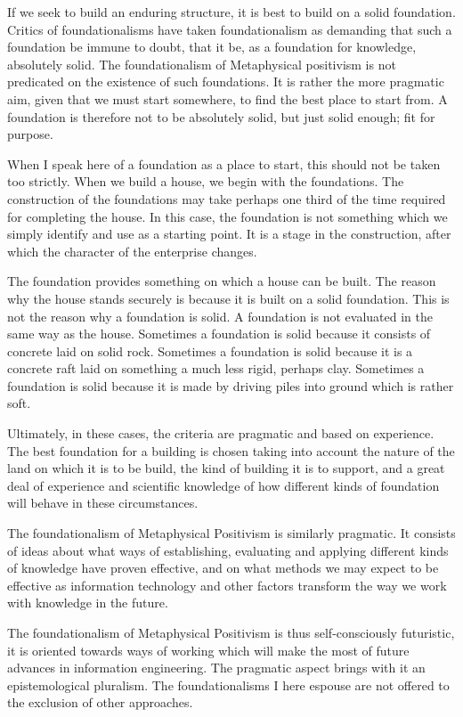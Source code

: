 If we seek to build an enduring structure, it is best to build on a
solid foundation. 
Critics of foundationalisms have taken foundationalism as demanding
that such a foundation be immune to doubt, that it be, as a foundation
for knowledge, absolutely solid.
The foundationalism of Metaphysical positivism is not predicated on
the existence of such foundations.
It is rather the more pragmatic aim, given that we must start
somewhere, to find the best place to start from.
A foundation is therefore not to be absolutely solid, but just solid
enough; fit for purpose.

When I speak here of a foundation as a place to start, this should not
be taken too strictly.
When we build a house, we begin with the foundations.
The construction of the foundations may take perhaps one third of the
time required for completing the house.
In this case, the foundation is not something which we simply identify
and use as a starting point.
It is a stage in the construction, after which the character of the
enterprise changes.

The foundation provides something on which a house can be built.
The reason why the house stands securely is because it is built on a
solid foundation.
This is not the reason why a foundation is solid.
A foundation is not evaluated in the same way as the house.
Sometimes a foundation is solid because it consists of concrete laid
on solid rock.
Sometimes a foundation is solid because it is a concrete raft laid on
something a much less rigid, perhaps clay.
Sometimes a foundation is solid because it is made by driving piles
into ground which is rather soft.

Ultimately, in these cases, the criteria are pragmatic and based on
experience.
The best foundation for a building is chosen taking into account the
nature of the land on which it is to be build, the kind of building it
is to support, and a great deal of experience and scientific knowledge
of how different kinds of foundation will behave in these
circumstances.

The foundationalism of Metaphysical Positivism is similarly pragmatic.
It consists of ideas about what ways of establishing, evaluating and
applying different kinds of knowledge have proven effective, and on
what methods we may expect to be effective as information technology
and other factors transform the way we work with knowledge in the
future.

The foundationalism of Metaphysical Positivism is thus
self-consciously futuristic, it is oriented towards ways of working
which will make the most of future advances in information
engineering. 
The pragmatic aspect brings with it an epistemological pluralism.
The foundationalisms I here espouse are not offered to the exclusion
of other approaches.

